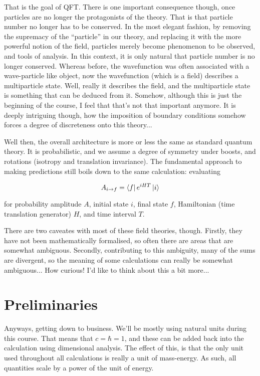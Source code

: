 \documentclass{report}
\theoremstyle{definition}
\begin{document}
That is the goal of QFT. There is one important consequence though, once
particles are no longer the protagonists of the theory. That is that particle
number no longer has to be conserved. In the most elegant fashion, by removing
the supremacy of the ``particle'' in our theory, and replacing it with the more
powerful notion of the field, particles merely become phenomenon to be observed,
and tools of analysis. In this context, it is only natural that particle number
is no longer conserved. Whereas before, the wavefunction was often associated
with a wave-particle like object, now the wavefunction (which is a field)
describes a multiparticle state. Well, really it describes the field, and the
multiparticle state is something that can be deduced from it. Somehow, although
this is just the beginning of the course, I feel that that's not that important
anymore. It is deeply intriguing though, how the imposition of boundary
conditions somehow forces a degree of discreteness onto this theory...

Well then, the overall architecture is more or less the same as standard quantum
theory. It is probabilistic, and we assume a degree of symmetry under
boosts, and rotations (isotropy and translation invariance). The fundamental
approach to making predictions still boils down to the same calculation:
evaluating

$$ A_{i \to f} = \bra{f} e^{i H T} \ket{i} $$

for probability amplitude $A$, initial state $i$, final state $f$, Hamiltonian
(time translation generator) $H$, and time interval $T$.

There are two caveates with most of these field theories, though. Firstly, they
have not been mathematically formalised, so often there are areas that are
somewhat ambiguous. Secondly, contributing to this ambiguity, many of the sums
are divergent, so the meaning of some calculations can really be somewhat
ambiguous... How curious! I'd like to think about this a bit more...

\section{Preliminaries}

Anyways, getting down to business. We'll be mostly using natural units during
this course. That means that $c = \hbar = 1$, and these can be added back into
the calculation using dimensional analysis. The effect of this, is that the only
unit used throughout all calculations is really a unit of mass-energy. As such,
all quantities scale by a power of the unit of energy. 
\end{document}
